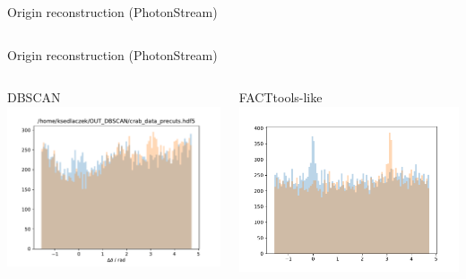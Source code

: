 \begin{frame}{Origin reconstruction (PhotonStream)}
\begin{columns}[onlytextwidth]
\begin{column}{0.475\textwidth}
    \end{column}
  \end{columns}
\end{frame}

\begin{frame}{Origin reconstruction (PhotonStream)}
  \begin{columns}[onlytextwidth]
    \begin{column}{0.475\textwidth}
        \centering
        \Large{DBSCAN}
        \includegraphics[width=\textwidth]{fig/delta_delta_specific.pdf}
    \end{column}
    \hfill%
    \begin{column}{0.475\textwidth}
        \centering
        \Large{FACTtools-like}
        \includegraphics[width=\textwidth]{fig/delta_delta_fact.pdf}
    \end{column}
  \end{columns}
\end{frame}

